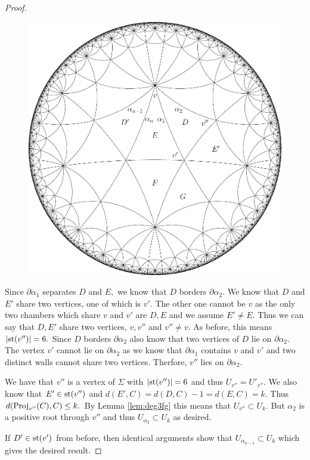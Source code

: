 \documentclass[class=book, crop=false]{standalone}
\begin{document}
\begin{proof}
\begin{figure}[h]
	\label{fig:33n}
	\begin{center}
		\includegraphics[width=4.5 in]{diagrams/deg33n.pdf}
\end{center}
\end{figure}


	Since $\partial\alpha_1$ separates $D$ and $E,$ we know that $D$ borders $\partial \alpha_2.$ We know that $D$ and $E'$ share two vertices, one of which is $v'.$ The other one cannot be $v$ as the only two chambers which share $v$ and $v'$ are $D,E$ and we assume $E'\neq E.$ Thus we can say that $D,E'$ share two vertices, $v,v''$ and $v''\neq v.$ As before, this means $|\mathrm{st}(v'')|=6.$ Since $D$ borders $\partial \alpha_2$ also know that two vertices of $D$ lie on $\partial \alpha_2.$ The vertex $v'$ cannot lie on $\partial\alpha_2$ as we know that $\partial\alpha_1$ contains $v$ and $v'$ and two distinct walls cannot share two vertices. Therfore, $v''$ lies on $\partial \alpha_2.$ 

	We have that $v''$ is a vertex of $\Sigma$ with $|\mathrm{st}(v'')|=6$ and thus $U_{v''}=U'_{v''}.$ We also know that $E'\in \mathrm{st}(v'')$ and $d(E',C)=d(D,C)-1=d(E,C)=k.$ Thus $d(\mathrm{Proj}_{v''}(C),C)\le k.$ By Lemma \ref{lem:deg3fg} this means that $U_{v''}\subset U_k.$ But $\alpha_2$ is a positive root through $v''$ and thus $U_{\alpha_2}\subset U_k$ as desired.

	If $D'\in \mathrm{st}(v')$ from before, then identical arguments show that $U_{\alpha_{n-1}}\subset U_k$ which gives the desired result.
\end{proof}
\end{document}
